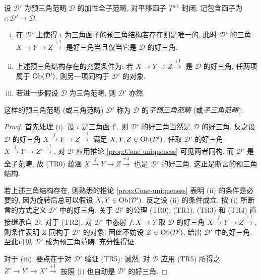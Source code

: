 \begin{definition-proposition}[子预三角范畴]\label{def:triangulated-subcat}
	设 $\mathcal{D}'$ 为预三角范畴 $\mathcal{D}$ 的加性全子范畴, 对平移函子 $T^{\pm 1}$ 封闭. 记包含函子为 $\iota: \mathcal{D}' \to \mathcal{D}$.
	\begin{enumerate}[(i)]
		\item 在 $\mathcal{D}'$ 上使得 $\iota$ 为三角函子的预三角结构若存在则是唯一的, 此时 $\mathcal{D}'$ 的三角 $X \to Y \to Z \xrightarrow{+1}$ 是好三角当且仅当它是 $\mathcal{D}$ 的好三角.
		\item 上述预三角结构存在的充要条件为: 若 $X \to Y \to Z \xrightarrow{+1}$ 是 $\mathcal{D}$ 的好三角, 任两项属于 $\operatorname{Ob}(\mathcal{D}')$, 则另一项同构于 $\mathcal{D}'$ 的对象.
		\item 若进一步假设 $\mathcal{D}$ 为三角范畴, 则 $\mathcal{D}'$ 亦然.
	\end{enumerate}

	这样的预三角范畴 (或三角范畴) $\mathcal{D}'$ 称为 $\mathcal{D}$ 的\emph{子预三角范畴} (或\emph{子三角范畴}).
\end{definition-proposition}
\begin{proof}
	首先处理 (i). 设 $\iota$ 是三角函子, 则 $\mathcal{D}'$ 的好三角当然是 $\mathcal{D}$ 的好三角. 反之设 $\mathcal{D}$ 的好三角 $X \xrightarrow{f} Y \to Z \xrightarrow{+1}$ 满足 $X, Y, Z \in \operatorname{Ob}(\mathcal{D}')$. 任取 $\mathcal{D}'$ 的好三角 $X \xrightarrow{f} Y \to Z' \xrightarrow{+1}$, 对 $\mathcal{D}$ 应用推论 \ref{prop:Cone-uniqueness} 可见两者同构, 而 $\mathcal{D}'$ 是全子范畴, 故 (TR0) 蕴涵 $X \xrightarrow{f} Y \to Z \xrightarrow{+1}$ 也是 $\mathcal{D}'$ 的好三角. 这正是断言的预三角结构.
	
	若上述三角结构存在, 则熟悉的推论 \ref{prop:Cone-uniqueness} 表明 (ii) 的条件是必要的, 因为旋转后总可以假设 $X, Y \in \operatorname{Ob}(\mathcal{D}')$. 反之设 (ii) 的条件成立, 按 (i) 所断言的方式定义 $\mathcal{D}'$ 中的好三角. 关于 $\mathcal{D}'$ 的公理 (TR0), (TR1), (TR3) 和 (TR4) 直接继承自 $\mathcal{D}$. 对于 (TR2), 对 $\mathcal{D}'$ 中态射 $f: X \to Y$ 取 $\mathcal{D}$ 的好三角 $X \xrightarrow{f} Y \to Z \xrightarrow{+1}$, 则条件表明 $Z$ 同构于 $\mathcal{D}'$ 的对象; 因此不妨设 $Z \in \operatorname{Ob}(\mathcal{D}')$, 给出 $\mathcal{D}'$ 中的好三角. 至此可见 $\mathcal{D}'$ 成为预三角范畴. 充分性得证.

	对于 (iii), 要点在于对 $\mathcal{D}'$ 验证 (TR5): 诚然, 对 $\mathcal{D}$ 应用 (TR5) 所得之 $Z' \to Y' \to X' \xrightarrow{+1}$ 按照 (i) 也自动是 $\mathcal{D}'$ 的好三角.
\end{proof}

